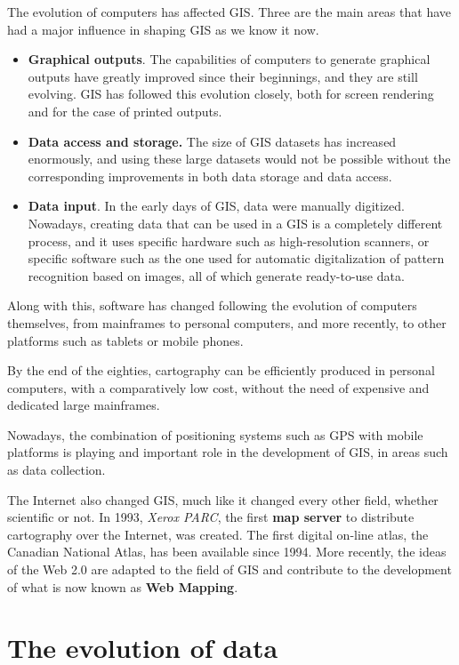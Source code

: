 The evolution of computers has affected GIS. Three are the main areas that have had a major influence in shaping GIS as we know it now.

\begin{itemize}
 \item \textbf{Graphical outputs}. The capabilities of computers to generate graphical outputs have greatly improved since their beginnings, and they are still evolving. GIS has followed this evolution closely, both for screen rendering and for the case of printed outputs.
\item \textbf{Data access and storage.} The size of GIS datasets has increased enormously, and using these large datasets would not be possible without the corresponding improvements in both data storage and data access.
\item \textbf{Data input}. In the early days of GIS, data were manually digitized. Nowadays, creating data that can be used in a GIS is a completely different process, and it uses specific hardware such as high-resolution scanners, or specific software such as the one used for automatic digitalization of pattern recognition based on images, all of which generate ready-to-use data.
\end{itemize}

Along with this, software has changed following the evolution of computers themselves, from mainframes to personal computers, and more recently, to other platforms such as tablets or mobile phones.

By the end of the eighties, cartography can be efficiently produced in personal computers, with a comparatively low cost, without the need of expensive and dedicated large mainframes.

Nowadays, the combination of positioning systems such as GPS with mobile platforms is playing and important role in the development of GIS, in areas such as data collection.

The Internet also changed GIS, much like it changed every other field, whether scientific or not. In 1993, \emph{Xerox PARC}, the first \textbf{map server} to distribute cartography over the Internet, was created. The first digital on-line atlas, the Canadian National Atlas, has been available since 1994. More recently, the ideas of the Web 2.0 are adapted to the field of GIS and contribute to the development of what is now known as \textbf{Web Mapping}.

\section{The evolution of data}

